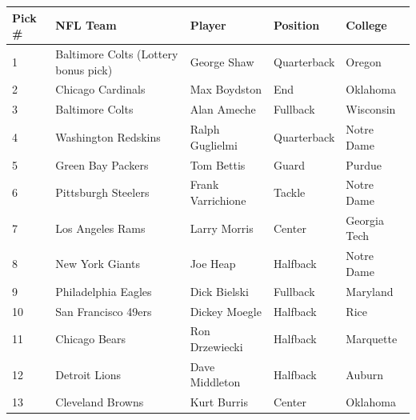 \documentclass{article}
\begin{document}
\begin{tabular}{lllll}
\toprule
Pick \# & NFL Team & Player & Position & College \\
\midrule
1 & Baltimore Colts (Lottery bonus pick) & George Shaw & Quarterback & Oregon \\
2 & Chicago Cardinals & Max Boydston & End & Oklahoma \\
3 & Baltimore Colts & Alan Ameche & Fullback & Wisconsin \\
4 & Washington Redskins & Ralph Guglielmi & Quarterback & Notre Dame \\
5 & Green Bay Packers & Tom Bettis & Guard & Purdue \\
6 & Pittsburgh Steelers & Frank Varrichione & Tackle & Notre Dame \\
7 & Los Angeles Rams & Larry Morris & Center & Georgia Tech \\
8 & New York Giants & Joe Heap & Halfback & Notre Dame \\
9 & Philadelphia Eagles & Dick Bielski & Fullback & Maryland \\
10 & San Francisco 49ers & Dickey Moegle & Halfback & Rice \\
11 & Chicago Bears & Ron Drzewiecki & Halfback & Marquette \\
12 & Detroit Lions & Dave Middleton & Halfback & Auburn \\
13 & Cleveland Browns & Kurt Burris & Center & Oklahoma \\
\bottomrule
\end{tabular}
\end{document}
